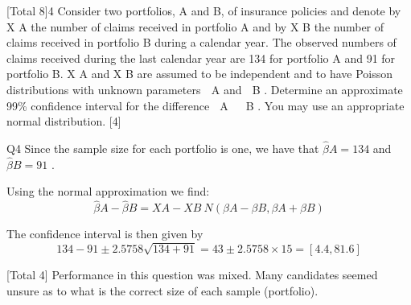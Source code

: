 \documentclass[a4paper,12pt]{article}
\begin{document}
[Total 8]4
Consider two portfolios, A and B, of insurance policies and denote by X A the number of claims received in portfolio A and by X B the number of claims received in portfolio B during a calendar year. The observed numbers of claims received during the last calendar year are 134 for portfolio A and 91 for portfolio B. X A and X B are assumed to be independent and to have Poisson distributions with 
unknown parameters  A and  B .
Determine an approximate 99\% confidence interval for the difference  A   B . You
may use an appropriate normal distribution.
[4]

Q4
Since the sample size for each portfolio is one, we have that $\hat{\beta} A = 134$ and $\hat{\beta} B = 91$ .

Using the normal approximation we find:
\[\hat{\beta} A − \hat{\beta} B = X A − X B ~ N ( \beta A − \beta B , \beta A + \beta B )\]

The confidence interval is then given by
\[134 − 91 \pm 2.5758 \sqrt{134 + 91} = 43 \pm 2.5758 \times 15 = [ 4.4, 81.6 ]\]

[Total 4]
Performance in this question was mixed. Many candidates seemed unsure
as to what is the correct size of each sample (portfolio).
\end{document}
